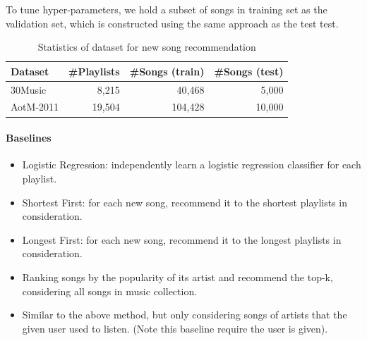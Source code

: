 To tune hyper-parameters, we hold a subset of songs in training set as the validation set, 
which is constructed using the same approach as the test test.

\begin{table}[!h]
\centering
\caption{Statistics of dataset for new song recommendation}
\label{tab:stats_newsongrec}
\small
\begin{tabular}{lrrr}
\toprule
Dataset   & \#Playlists & \#Songs (train) & \#Songs (test) \\
\midrule
30Music   & 8,215       & 40,468          & 5,000 \\
AotM-2011 & 19,504      & 104,428         & 10,000 \\
\bottomrule
\end{tabular}
\end{table}

\paragraph{Baselines}
\begin{itemize}
\item Logistic Regression: independently learn a logistic regression classifier for each playlist.
\item Shortest First: for each new song, recommend it to the shortest playlists in consideration.
\item Longest First: for each new song, recommend it to the longest playlists in consideration.
\item Ranking songs by the popularity of its artist and recommend the top-k, considering all songs in music collection.
\item Similar to the above method, but only considering songs of artists that the given user used to listen. 
(Note this baseline require the user is given).
\end{itemize}



